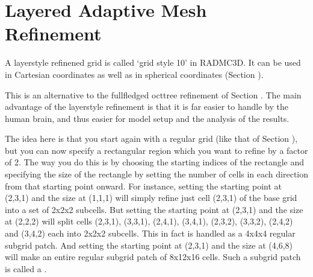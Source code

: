 \documentclass[letterpaper,10pt,english]{sphinxmanual}
\begin{document}
\section{Layered Adaptive Mesh Refinement}
\label{\detokenize{gridding:layered-adaptive-mesh-refinement}}\label{\detokenize{gridding:sec-layered-amr}}
A layer\sphinxhyphen{}style refinened grid is called ‘grid style 10’ in RADMC\sphinxhyphen{}3D. It can
be used in Cartesian coordinates as well as in spherical coordinates
(Section {\hyperref[\detokenize{basicstructure:sec-coord-systems}]{}}).

This is an alternative to the full\sphinxhyphen{}fledged oct\sphinxhyphen{}tree refinement of Section
{\hyperref[\detokenize{gridding:sec-oct-tree-amr}]{}}. The main advantage of the layer\sphinxhyphen{}style refinement is
that it is far easier to handle by the human brain, and thus easier for
model setup  and the analysis of the results.

The idea here is that you start again with a regular grid (like that of
Section {\hyperref[\detokenize{gridding:sec-regular-grid}]{}}), but you can now specify a rectangular
region which you want to refine by a factor of 2. The way you do this is by
choosing the starting indices of the rectangle and specifying the size of
the rectangle by setting the number of cells in each direction from that
starting point onward. For instance, setting the starting point at (2,3,1)
and the size at (1,1,1) will simply refine just cell (2,3,1) of the base
grid into a set of 2x2x2 sub\sphinxhyphen{}cells. But setting the starting point at
(2,3,1) and the size at (2,2,2) will split cells (2,3,1), (3,3,1), (2,4,1),
(3,4,1), (2,3,2), (3,3,2), (2,4,2) and (3,4,2) each into 2x2x2 subcells.
This in fact is handled as a 4x4x4 regular sub\sphinxhyphen{}grid patch. And setting the
starting point at (2,3,1) and the size at (4,6,8) will make an entire
regular sub\sphinxhyphen{}grid patch of 8x12x16 cells. Such a sub\sphinxhyphen{}grid patch is
called a .
\end{document}
